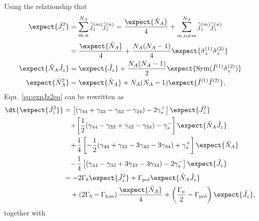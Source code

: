 \documentclass[]{report}
\begin{document}
Using the relationship that 
\begin{align}
\expect{\hat{J}_z^2} &= \sum_{m,n}^{N_A} \hat{j}_z^{(m)}\hat{j}_z^{(n)} = \frac{\expect{\hat{N}_A}}{4} + \sum_{m,n\neq m}^{N_A} \hat{j}_z^{(m)}\hat{j}_z^{(n)}\\
&= \frac{\expect{\hat{N}_A}}{4} + \frac{N_A(N_A-1)}{4} \expect{\hat{\sigma}_z^{(1)} \hat{\sigma}_z^{(2)}}\\
\expect{\hat{N}_A \hat{J}_z} &= \expect{\hat{J}_z } + \frac{N_A(N_A-1)}{2} \expect{\mathrm{Sym}(\hat{I}^{(1)}\hat{\sigma}_z^{(2)} ) }\\
\expect{\hat{N}_A^2} &= \expect{\hat{N}_A} + N_A(N_A-1)\expect{\hat{I}^{(1)}\hat{I}^{(2)}},
\end{align}
Equ.~\eqref{eq:expJz2eq} can be rewritten as
\begin{align}
\dt{\expect{\hat{J}_z^2}} &=\left[ (\gamma_{44}+\gamma_{33}-\gamma_{43}-\gamma_{34})  -2\gamma_s^+\right]\expect{\hat{J}_z^2} \nonumber\\
&\quad \!+\!  \left[ \frac{1}{2}(\gamma_{44}-\gamma_{33}+\gamma_{43}-\gamma_{34})  -\gamma_s^-\right]\expect{\hat{N}_{A}\hat{J}_z } \nonumber\\
&\quad \!+\!  \frac{1}{4}\left[ -\frac{1}{2} (\gamma_{44}+\gamma_{33} - 3\gamma_{43} -3\gamma_{34})  +\gamma_s^+\right]\expect{\hat{N}_A} \nonumber\\
&\quad \!-\! \frac{1}{4} \left[  (\gamma_{44}-\gamma_{33}+3\gamma_{43}-3\gamma_{34})  -2\gamma_s^-\right] \expect{\hat{J}_z}\\
&= -2\Gamma_b\expect{\hat{J}_z^2}+\Gamma_{\rm pol}\expect{\hat{N}_{A}\hat{J}_z }\nonumber\\
&\quad +\left(2\Gamma_b-\Gamma_{\rm loss} \right)\frac{\expect{\hat{N}_A}}{4} +\left(\frac{\Gamma_a}{2}-\Gamma_{\rm pol} \right) \expect{\hat{J}_z},\label{eq:expJz2eq_op}
\end{align}
together with
\end{document}

